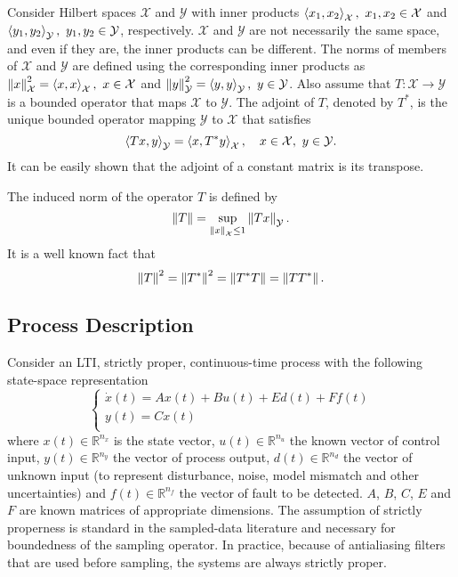 \documentclass[A4paper,conference]{IEEEtran}
\begin{document}
Consider Hilbert spaces $\mathcal{X}$  and $\mathcal{Y}$ with inner
products $\left \langle x_1,x_2\right \rangle_\mathcal{X},~x_1,x_2 \in \mathcal{X}$ and
$\left \langle y_1,y_2\right \rangle_\mathcal{Y},~ y_1,y_2 \in \mathcal{Y}$,
respectively. $\mathcal{X}$ and $\mathcal{Y}$ are not necessarily
the same space, and even if they are, the inner products can be
different. The norms of members of $\mathcal{X}$ and $\mathcal{Y}$
are defined using the corresponding inner products as
$\left\lVert x\right \lVert_\mathcal{X}^2 = \left \langle x,x\right \rangle_\mathcal{X},~ x\in
\mathcal{X}$ and $\left\lVert y\right \lVert_\mathcal{Y}^2 =
\left \langle y,y\right \rangle_\mathcal{Y},~ y\in \mathcal{Y}$. Also assume that
$T:\mathcal{X} \rightarrow \mathcal{Y}$ is a bounded operator that
maps $\mathcal{X}$ to $\mathcal{Y}$. The adjoint of $T$, denoted by
$T^*$, is the unique bounded operator mapping $\mathcal{Y}$ to
$\mathcal{X}$ that satisfies
\begin{equation*}
    \left \langle Tx,y\right \rangle_\mathcal{Y} = \left \langle x,T^*y\right \rangle_\mathcal{X}, \quad x \in \mathcal{X},~ y
    \in \mathcal{Y}.
\end{equation*}
It can be easily shown that the adjoint of a constant matrix is its
transpose.

The induced norm of the operator $T$ is defined by
\begin{equation*}
    \left\lVert T\right \lVert = \sup_{\left\lVert x\right \lVert_\mathcal{X}\leq1} \left\lVert Tx\right \lVert_\mathcal{Y}.
\end{equation*}
It is a well known fact  that
\begin{equation}\label{norms}
    \left\lVert T\right \lVert^2 = \left\lVert T^*\right \lVert^2 = \left\lVert T^*T\right \lVert = \left\lVert TT^*\right \lVert.
\end{equation}

\subsection{Process Description}
Consider an LTI, strictly proper, continuous-time process with the
following state-space representation
\begin{equation}\label{mainsys}
\left \{\begin{array}{l}
 \dot{x}(t)=Ax(t)+Bu(t)+Ed(t)+Ff(t) \\
 y(t)=Cx(t) \\
 \end{array}\right.
\end{equation}
where $x(t)\in \mathbb{R}^{n_x}$ is the state vector, $u(t)\in
\mathbb{R}^{n_u}$ the known vector of control input, $y(t)\in
\mathbb{R}^{n_y}$ the vector of process output, $d(t)\in
\mathbb{R}^{n_d}$ the vector of unknown input (to represent
disturbance, noise, model mismatch and other uncertainties) and
$f(t)\in \mathbb{R}^{n_f}$ the vector of fault to be detected. $A$,
$B$, $C$, $E$ and $F$ are known matrices of appropriate dimensions.
The assumption of strictly properness is standard in the
sampled-data literature and necessary for boundedness of the
sampling operator. In practice, because of antialiasing  filters
that are used before sampling, the systems are always strictly
proper.
\end{document}
